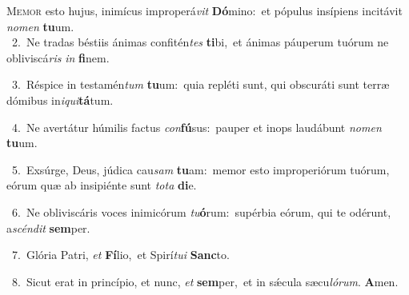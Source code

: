 \lettrine{\initial\textcolor{\initialcolor}{M}}{emor} esto hujus, inimícus improperá\textit{vit} \textbf{Dó}\-mino:~\star et pópulus insípiens incitávit \textit{no}\-\textit{men} \textbf{tu}\-um.\\
{\numbfont\textcolor{\numbcolor}{~2.}}~Ne tradas béstiis ánimas confitén\textit{tes} \textbf{ti}\-bi,~\star et ánimas páuperum tuórum ne obliviscá\textit{ris} \textit{in} \textbf{fi}\-nem.\par
{\numbfont\textcolor{\numbcolor}{~3.}}~Réspice in testamén\textit{tum} \textbf{tu}\-um:~\star quia repléti sunt, qui obscuráti sunt terræ dómibus in\-\textit{i}\-\textit{qui}\textbf{tá}tum.\par
{\numbfont\textcolor{\numbcolor}{~4.}}~Ne avertátur húmilis factus \textit{con}\-\textbf{fú}sus:~\star pauper et inops laudábunt \textit{no}\-\textit{men} \textbf{tu}\-um.\par
{\numbfont\textcolor{\numbcolor}{~5.}}~Exsúrge, Deus, júdica cau\textit{sam} \textbf{tu}\-am:~\star memor esto improperiórum tuórum, eórum quæ ab insipiénte sunt \textit{to}\-\textit{ta} \textbf{di}\-e.\par
{\numbfont\textcolor{\numbcolor}{~6.}}~Ne obliviscáris voces inimicórum \textit{tu}\-\textbf{ó}rum:~\star supérbia eórum, qui te odérunt, a\-\textit{scén}\-\textit{dit} \textbf{sem}\-per.\par
{\numbfont\textcolor{\numbcolor}{~7.}}~Glória Patri, \textit{et} \textbf{Fí}\-lio,~\star et Spirí\-\textit{tu}\-\textit{i} \textbf{Sanc}\-to.\par
{\numbfont\textcolor{\numbcolor}{~8.}}~Sicut erat in princípio, et nunc, \textit{et} \textbf{sem}\-per,~\star et in sǽcula sæcu\-\textit{ló}\-\textit{rum}. \textbf{A}\-men.\par
